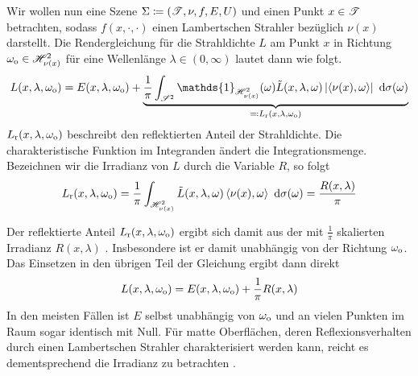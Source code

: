		Wir wollen nun eine Szene $\Sigma\coloneqq(\mathscr{T},\nu,f,E,U)$ und einen Punkt $x\in\mathscr{T}$ betrachten, sodass $f(x,\cdot,\cdot)$ einen Lambertschen Strahler bezüglich $\nu(x)$ darstellt.
		Die Rendergleichung für die Strahldichte $L$ am Punkt $x$ in Richtung $\omega_{\mathrm{o}}\in\mathscr{H}^{2}_{\nu(x)}$ für eine Wellenlänge $\lambda\in(0,\infty)$ lautet dann wie folgt.
		\[
			L(x,\lambda,\omega_\m{o}) = E(x,\lambda,\omega_\m{o}) + \underbrace{\frac{1}{\pi} \integral{\ssp}{}{\mathds{1}_{\shs{\nu(x)}}(\omega) \tilde{L}(x,\lambda,\omega) \abs{\dotp{\nu(x)}{\omega}} }{\sigma(\omega)}}_{\definedby L_\m{r}(x,\lambda,\omega_\m{o})}
		\]
		$L_{\mathrm{r}}(x,\lambda,\omega_{\mathrm{o}})$ beschreibt den reflektierten Anteil der Strahldichte.
		Die charakteristische Funktion im Integranden ändert die Integrationsmenge.
		Bezeichnen wir die Irradianz von $L$ durch die Variable $R$, so folgt
		\[
			L_{\mathrm{r}}(x,\lambda,\omega_{\mathrm{o}}) = \frac{1}{\pi} \int_{\mathscr{H}^{2}_{\nu(x)}}^{} \tilde{L}(x,\lambda,\omega) \left\langle \nu(x),\omega \right\rangle\ \mathrm{d} \sigma(\omega) = \frac{R(x,\lambda)}{\pi}
		\]

		Der reflektierte Anteil $L_{\mathrm{r}}(x,\lambda,\omega_{\mathrm{o}})$ ergibt sich damit aus der mit $\frac{1}{\pi}$ skalierten Irradianz $R(x,\lambda)$ \cite[S.~785~f]{pbrt2}.
		Insbesondere ist er damit unabhängig von der Richtung $\omega_{\mathrm{o}}$.
		Das Einsetzen in den übrigen Teil der Gleichung ergibt dann direkt
		\[
			L(x,\lambda,\omega_{\mathrm{o}}) = E(x,\lambda,\omega_{\mathrm{o}}) + \frac{1}{\pi}R(x,\lambda)
		\]
		In den meisten Fällen ist $E$ selbst unabhängig von $\omega_{\mathrm{o}}$ und an vielen Punkten im Raum sogar identisch mit Null.
		Für matte Oberflächen, deren Reflexionsverhalten durch einen Lambertschen Strahler charakterisiert werden kann, reicht es dementsprechend die Irradianz zu betrachten \cite{irr-grad,irradiance-caching}.


